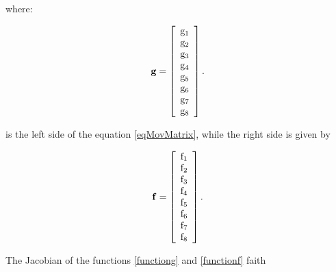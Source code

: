 \documentclass[sublist]{fei}
\begin{document}
where:

\begin{equation} \label{functiong}
    {\bf g} = \left[ \begin{array}{c} {\rm g}_1 \\ {\rm g}_2 \\ {\rm g}_3 \\ {\rm g}_4 \\ {\rm g}_5 \\ {\rm g}_6 \\ {\rm g}_7 \\ {\rm g}_8 \end{array} \right].
\end{equation}

is the left side of the equation \eqref {eqMovMatrix}, while the right side is given by

\begin{equation} \label{functionf}
    {\bf f} = \left[ \begin{array}{c} {\rm f}_1 \\ {\rm f}_2 \\ {\rm f}_3 \\ {\rm f}_4 \\ {\rm f}_5 \\ {\rm f}_6 \\ {\rm f}_7 \\ {\rm f}_8 \end{array} \right].
\end{equation}

The Jacobian of the functions \eqref{functiong} and \eqref{functionf} faith
\end{document}
